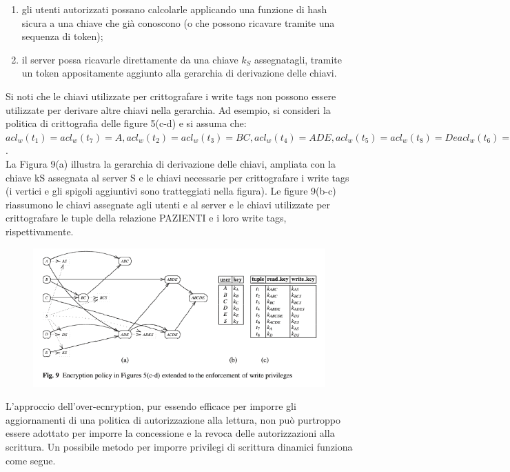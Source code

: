 \begin{enumerate}[label=\roman*)]
    \item gli utenti autorizzati possano calcolarle applicando una funzione di hash sicura a una chiave che già conoscono (o che possono ricavare tramite una sequenza di token);
    \item il server possa ricavarle direttamente da una chiave $k_S$ assegnatagli, tramite un token appositamente aggiunto alla gerarchia di derivazione delle chiavi.
\end{enumerate}
Si noti che le chiavi utilizzate per crittografare i write tags non possono essere utilizzate per derivare altre chiavi nella gerarchia. Ad esempio, si consideri la politica di crittografia delle figure 5(c-d) e si assuma che:\\
$acl_w(t_1)=acl_w(t_7)=A, acl_w(t_2)=acl_w(t_3)=BC, acl_w(t_4)=ADE, acl_w(t_5)=acl_w(t_8)=D e acl_w(t_6)=E$.\\
\newline
La Figura 9(a) illustra la gerarchia di derivazione delle chiavi, ampliata con la chiave kS assegnata al server S e le chiavi necessarie per crittografare i write tags (i vertici e gli spigoli aggiuntivi sono tratteggiati nella figura). Le figure 9(b-c) riassumono le chiavi assegnate agli utenti e al server e le chiavi utilizzate per crittografare le tuple della relazione PAZIENTI e i loro write tags, rispettivamente.

\begin{figure}[h!]
    \centering
    \includegraphics[width=1\linewidth]{paper_selective-and-private-access-to-outsourced-data-centers/image4.png}
\end{figure}

L'approccio dell'over-ecnryption, pur essendo efficace per imporre gli aggiornamenti di una politica di autorizzazione alla lettura, non può purtroppo essere adottato per imporre la concessione e la revoca delle autorizzazioni alla scrittura. Un possibile metodo per imporre privilegi di scrittura dinamici funziona come segue.

